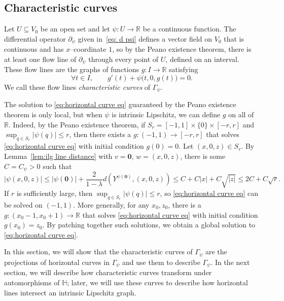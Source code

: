 \documentclass[11pt,reqno]{amsart}
\renewcommand{\H}{\mathbb{H}}
\newcommand{\R}{\mathbb{R}}
\newcommand{\0}{\mathbf{0}}
\renewcommand{\1}{\mathbf 1}
\newcommand{\from}{\colon}
\renewcommand{\subset}{\subseteq}
\renewcommand{\le}{\leqslant}
\theoremstyle{remark}
\begin{document}
\subsection{Characteristic curves}\label{sec:char}
Let $U\subset V_0$ be an open set and let $\psi\from U\to \R$ be a continuous function.  The differential operator $\partial_\psi$ given in~\eqref{eq: d psi} defines a  vector field on $V_0$ that is continuous and has $x$--coordinate $1$, so by the Peano existence theorem, there is at least one flow line of $\partial_\psi$ through every point of $U$, defined on an interval. These flow lines are the graphs of functions $g\from I\to \R$ satisfying
\begin{equation}\label{eq:horizontal curve eq}
\forall  t\in I,\qquad   g'(t)+\psi\big(t,0,g(t)\big)=0.
\end{equation}
We call these flow lines \emph{characteristic curves} of $\Gamma_\psi$.

The solution to \eqref{eq:horizontal curve eq} guaranteed by the Peano existence theorem is only local, but when $\psi$ is intrinsic Lipschitz, we can define $g$ on all of $\R$. Indeed, by the Peano existence theorem, if $S_r=[-1,1]\times \{0\}\times [-r,r]$ and $\sup_{q\in S_r}|\psi(q)| \le r$, then there exists a $g\from (-1,1)\to [-r,r]$ that solves \eqref{eq:horizontal curve eq} with initial condition $g(0)=0$.  Let $(x,0,z)\in S_r$. By Lemma~\ref{lem:ilg line distance} with $v=\0$, $w=(x,0,z)$, there is some $C=C_\psi>0$ such that
$$|\psi(x,0,z)| \le |\psi(\0)| + \frac{2}{1-\lambda} d\left(Y^{\psi(\0)}, (x,0,z)\right) \le C + C|x| + C\sqrt{|z|} \le 2 C + C\sqrt{r}.$$
If $r$ is sufficiently large, then $\sup_{q\in S_r}|\psi(q)| \le r$, so \eqref{eq:horizontal curve eq} can be solved on $(-1,1)$. More generally, for any $x_0,z_0$, there is a $g\from (x_0-1,x_0+1)\to \R$ that solves \eqref{eq:horizontal curve eq} with initial condition $g(x_0)=z_0$. By patching together such solutions, we obtain a global solution to \eqref{eq:horizontal curve eq}.

In this section, we will show that the characteristic curves of $\Gamma_\psi$ are the projections of horizontal curves in $\Gamma_\psi$ and use them to describe $\Gamma_\psi$.  In the next section, we will describe how characteristic curves transform under automorphisms of $\H$; later, we will use these curves to describe how horizontal lines intersect an intrinsic Lipschitz graph.
\end{document}
